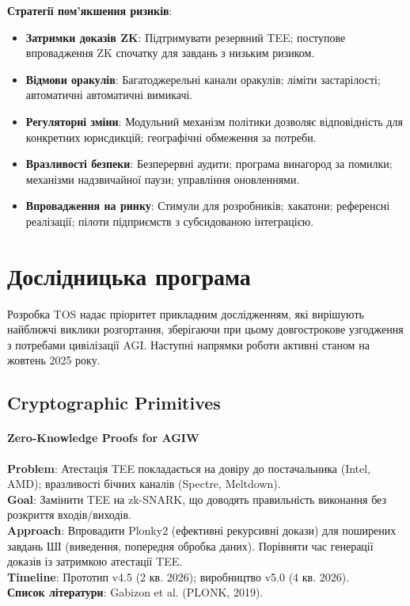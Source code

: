 \documentclass[11pt]{article}
\begin{document}
\textbf{Стратегії пом'якшення ризиків}:
\begin{itemize}[noitemsep]
  \item \textbf{Затримки доказів ZK}: Підтримувати резервний TEE; поступове впровадження ZK спочатку для завдань з низьким ризиком.
  \item \textbf{Відмови оракулів}: Багатоджерельні канали оракулів; ліміти застарілості; автоматичні автоматичні вимикачі.
  \item \textbf{Регуляторні зміни}: Модульний механізм політики дозволяє відповідність для конкретних юрисдикцій; географічні обмеження за потреби.
  \item \textbf{Вразливості безпеки}: Безперервні аудити; програма винагород за помилки; механізми надзвичайної паузи; управління оновленнями.
  \item \textbf{Впровадження на ринку}: Стимули для розробників; хакатони; референсні реалізації; пілоти підприємств з субсидованою інтеграцією.
\end{itemize}

\section{Дослідницька програма}
\label{sec:research}

Розробка TOS надає пріоритет прикладним дослідженням, які вирішують найближчі виклики розгортання, зберігаючи при цьому довгострокове узгодження з потребами цивілізації AGI. Наступні напрямки роботи активні станом на жовтень 2025 року.

\subsection{Cryptographic Primitives}

\paragraph{Zero-Knowledge Proofs for AGIW}
\textbf{Problem}: Атестація TEE покладається на довіру до постачальника (Intel, AMD); вразливості бічних каналів (Spectre, Meltdown).\\
\textbf{Goal}: Замінити TEE на zk-SNARK, що доводять правильність виконання без розкриття входів/виходів.\\
\textbf{Approach}: Впровадити Plonky2 (ефективні рекурсивні докази) для поширених завдань ШІ (виведення, попередня обробка даних). Порівняти час генерації доказів із затримкою атестації TEE.\\
\textbf{Timeline}: Прототип v4.5 (2 кв. 2026); виробництво v5.0 (4 кв. 2026).\\
\textbf{Список літератури}: Gabizon et al. (PLONK, 2019).
\end{document}
